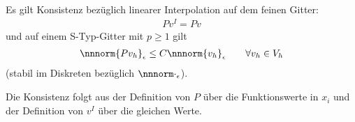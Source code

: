 \begin{lemma}\label{lem:6-19}
  Es gilt Konsistenz bezüglich linearer Interpolation auf dem feinen Gitter:
  \begin{align*}
    Pv^{I} = Pv
  \end{align*}
  und auf einem S-Typ-Gitter mit $p\geq1$ gilt
  \begin{align*}
    \nnnorm{Pv_{h}}_{\epsilon}\leq C  \nnnorm{v_{h}}_{\epsilon} \qquad \forall v_{h} \in V_{h} 
  \end{align*}
  (stabil im Diskreten bezüglich $\nnnorm \cdot_{\epsilon}$). 
\end{lemma}
\begin{beweis}
  Die Konsistenz folgt aus der Definition von $P$ über die Funktionswerte in $x_{i}$ und der Definition von $v^{I}$ über die gleichen Werte. 
  \smallskip


\end{beweis}
